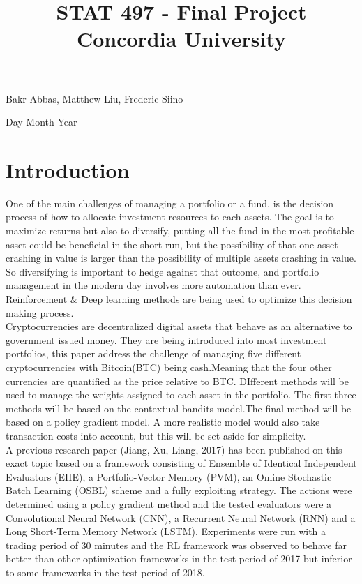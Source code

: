 \documentclass[a4paper,12pt]{article}
\title{
{STAT 497 - Final Project} \\
{\large Concordia University} \\
}
\date{}
\begin{document}
\begin{titlingpage}
  \maketitle
  \centering
  \vfill
  {\large{Bakr Abbas, Matthew Liu, Frederic Siino}} \par
  {\large{Day Month Year}}
\end{titlingpage}

\newpage

\section{Introduction}
One of the main challenges of managing a portfolio or a fund, is the decision process of how to allocate investment resources to each assets. The goal is to maximize returns but also to diversify, putting all the fund in the most profitable asset could be beneficial in the short run, but the possibility of that one asset crashing in value is larger than the possibility of multiple assets crashing in value. So diversifying is important to hedge against that outcome, and portfolio management in the modern day involves more automation than ever. Reinforcement \& Deep learning methods are being used to optimize this decision making process. \\

Cryptocurrencies are decentralized digital assets that behave as an alternative to government issued money. They are being introduced into most investment portfolios, this paper address the challenge of managing five different cryptocurrencies with Bitcoin(BTC) being cash.Meaning that the four other currencies are quantified as the price relative to BTC.  DIfferent methods will be used to manage the weights assigned to each asset in the portfolio. The first three methods will be based on the contextual bandits model.The final method will be based on a policy gradient model. A more realistic model would also take transaction costs into account, but this will be set aside for simplicity. \\

A previous research paper (Jiang, Xu, Liang, 2017) has been published on this exact topic based on a framework consisting of Ensemble of Identical Independent Evaluators (EIIE), a Portfolio-Vector Memory (PVM), an Online Stochastic Batch Learning (OSBL) scheme and a fully exploiting strategy. The actions were determined using a policy gradient method and the tested evaluators were a Convolutional Neural Network (CNN), a Recurrent Neural Network (RNN) and a Long Short-Term Memory Network (LSTM). Experiments were run with a trading period of 30 minutes and the RL framework was observed to behave far better than other optimization frameworks in the test period of 2017 but inferior to some frameworks in the test period of 2018. \\
\end{document}
